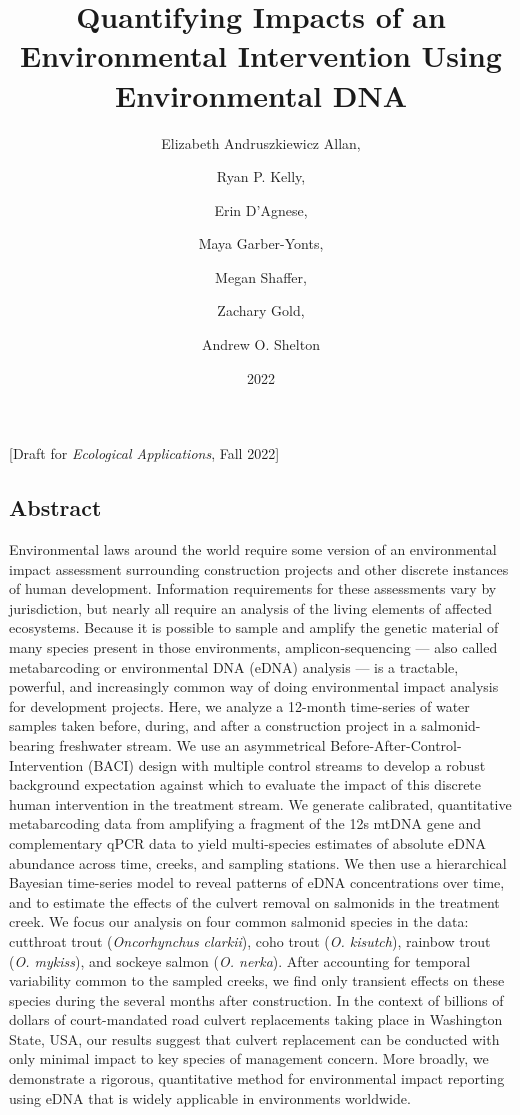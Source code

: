 \documentclass[
]{article}
\title{Quantifying Impacts of an Environmental Intervention Using
Environmental DNA}
\author{Elizabeth Andruszkiewicz Allan, \and Ryan P. Kelly, \and Erin
D'Agnese, \and Maya Garber-Yonts, \and Megan Shaffer, \and Zachary
Gold, \and Andrew O. Shelton}
\date{2022}
\begin{document}
\maketitle

{[}Draft for \emph{Ecological Applications}, Fall 2022{]}

\hypertarget{abstract}{%
\subsection{Abstract}\label{abstract}}

Environmental laws around the world require some version of an
environmental impact assessment surrounding construction projects and
other discrete instances of human development. Information requirements
for these assessments vary by jurisdiction, but nearly all require an
analysis of the living elements of affected ecosystems. Because it is
possible to sample and amplify the genetic material of many species
present in those environments, amplicon-sequencing --- also called
metabarcoding or environmental DNA (eDNA) analysis --- is a tractable,
powerful, and increasingly common way of doing environmental impact
analysis for development projects. Here, we analyze a 12-month
time-series of water samples taken before, during, and after a
construction project in a salmonid-bearing freshwater stream. We use an
asymmetrical Before-After-Control-Intervention (BACI) design with
multiple control streams to develop a robust background expectation
against which to evaluate the impact of this discrete human intervention
in the treatment stream. We generate calibrated, quantitative
metabarcoding data from amplifying a fragment of the 12s mtDNA gene and
complementary qPCR data to yield multi-species estimates of absolute
eDNA abundance across time, creeks, and sampling stations. We then use a
hierarchical Bayesian time-series model to reveal patterns of eDNA
concentrations over time, and to estimate the effects of the culvert
removal on salmonids in the treatment creek. We focus our analysis on
four common salmonid species in the data: cutthroat trout
(\emph{Oncorhynchus clarkii}), coho trout (\emph{O. kisutch}), rainbow
trout (\emph{O. mykiss}), and sockeye salmon (\emph{O. nerka}). After
accounting for temporal variability common to the sampled creeks, we
find only transient effects on these species during the several months
after construction. In the context of billions of dollars of
court-mandated road culvert replacements taking place in Washington
State, USA, our results suggest that culvert replacement can be
conducted with only minimal impact to key species of management concern.
More broadly, we demonstrate a rigorous, quantitative method for
environmental impact reporting using eDNA that is widely applicable in
environments worldwide.
\end{document}

